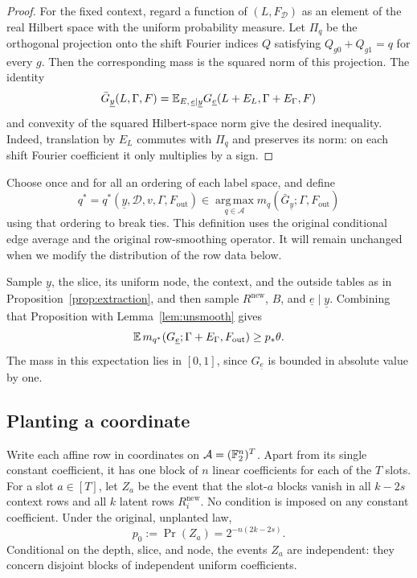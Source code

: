 \begin{proof}
For the fixed context, regard a function of $(L,F_{\mathcal D})$ as an
element of the real Hilbert space with the uniform probability measure.
Let $\Pi_q$ be the orthogonal projection onto the shift Fourier indices
$Q$ satisfying $Q_{g0}+Q_{g1}=q$ for every $g$.  Then the corresponding
mass is the squared norm of this projection.  The identity
\[
 \bar G_{\underline y}(L,\Gamma,F)
 =\mathbb E_{E,\,\underline e\mid\underline y}
 G_{\underline e}(L+E_L,\Gamma+E_\Gamma,F)
\]
and convexity of the squared Hilbert-space norm give the desired
inequality.  Indeed, translation by $E_L$ commutes with $\Pi_q$ and
preserves its norm: on each shift Fourier coefficient it only
multiplies by a sign.
\end{proof}

Choose once and for all an ordering of each label space, and define
\begin{equation}\label{eq:decoder-choice}
 q^*=q^*(\underline y,\mathcal D,v,\Gamma,F_{\mathrm{out}})
 \in\operatorname*{arg\,max}_{q\in\mathcal A}
 m_q(\bar G_{\underline y};\Gamma,F_{\mathrm{out}})
\end{equation}
using that ordering to break ties.  This definition uses the original
conditional edge average and the original row-smoothing operator.
It will remain unchanged when we modify the distribution of the row
data below.

Sample $\underline y$, the slice, its uniform node, the context, and
the outside tables as in Proposition~\ref{prop:extraction}, and then
sample $R^{\mathrm{new}}$, $B$, and $\underline e\mid\underline y$.
Combining that Proposition with Lemma~\ref{lem:unsmooth} gives
\begin{equation}\label{eq:unplanted-score}
 \mathbb E\,m_{q^*}(G_{\underline e};
              \Gamma+E_\Gamma,F_{\mathrm{out}})
 \geq p_*\theta.
\end{equation}
The mass in this expectation lies in $[0,1]$, since $G_{\underline e}$
is bounded in absolute value by one.

\subsection{Planting a coordinate}

Write each affine row in coordinates on
$\mathcal A=(\mathbb F_2^n)^T$.  Apart from its single constant coefficient, it
has one block of $n$ linear coefficients for each of the $T$ slots.
For a slot $a\in[T]$, let $Z_a$ be the event that the slot-$a$ blocks
vanish in all $k-2s$ context rows and all $k$ latent rows
$R^{\mathrm{new}}_i$.  No condition is imposed on any constant
coefficient.  Under the original, unplanted law,
\begin{equation}\label{eq:zero-slot-probability}
 p_0:=\Pr(Z_a)=2^{-n(2k-2s)}.
\end{equation}
Conditional on the depth, slice, and node, the events $Z_a$ are
independent: they concern disjoint blocks of independent uniform
coefficients.

